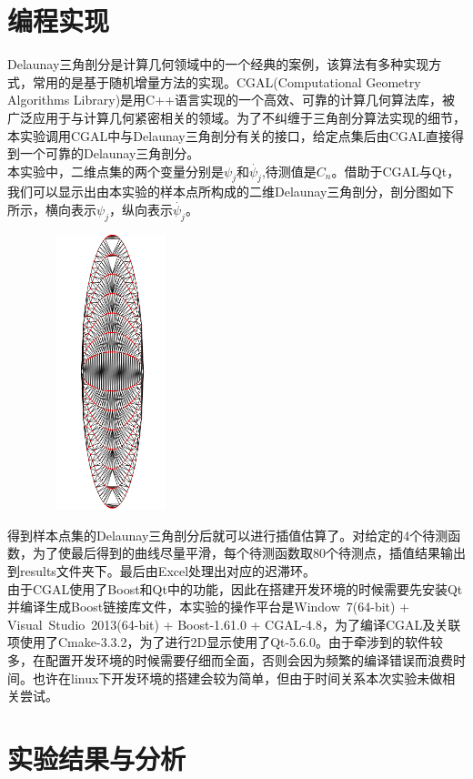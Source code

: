 \documentclass[UTF8]{ctexart}
\begin{document}
\section{编程实现}
Delaunay三角剖分是计算几何领域中的一个经典的案例，该算法有多种实现方式，常用的是基于随机增量方法的实现。CGAL(Computational Geometry Algorithms Library)是用C++语言实现的一个高效、可靠的计算几何算法库，被广泛应用于与计算几何紧密相关的领域。为了不纠缠于三角剖分算法实现的细节，本实验调用CGAL中与Delaunay三角剖分有关的接口，给定点集后由CGAL直接得到一个可靠的Delaunay三角剖分。\\
\indent 本实验中，二维点集的两个变量分别是$\psi_j$和$\dot{\psi_j}$,待测值是$C_n$。借助于CGAL与Qt，我们可以显示出由本实验的样本点所构成的二维Delaunay三角剖分，剖分图如下所示，横向表示$\psi_j$，纵向表示$\dot{\psi_j}$。\\
\begin{center}
\includegraphics[width=6cm, height=8cm]{../results/raw_img.PNG}
\end{center}

\indent 得到样本点集的Delaunay三角剖分后就可以进行插值估算了。对给定的4个待测函数，为了使最后得到的曲线尽量平滑，每个待测函数取80个待测点，插值结果输出到results文件夹下。最后由Excel处理出对应的迟滞环。\\
\indent 由于CGAL使用了Boost和Qt中的功能，因此在搭建开发环境的时候需要先安装Qt并编译生成Boost链接库文件，本实验的操作平台是Window\ 7(64-bit) + Visual\ Studio\  2013(64-bit) + Boost-1.61.0 + CGAL-4.8，为了编译CGAL及关联项使用了Cmake-3.3.2，为了进行2D显示使用了Qt-5.6.0。由于牵涉到的软件较多，在配置开发环境的时候需要仔细而全面，否则会因为频繁的编译错误而浪费时间。也许在linux下开发环境的搭建会较为简单，但由于时间关系本次实验未做相关尝试。

\section{实验结果与分析}
\end{document}
